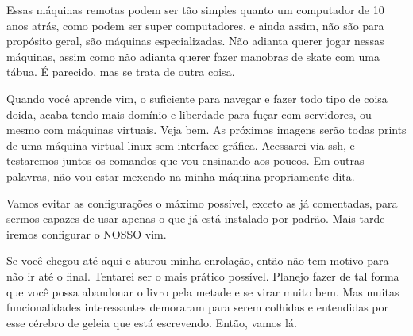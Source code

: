 Essas máquinas remotas podem ser tão simples quanto um computador de 10 anos atrás,
como podem ser super computadores, e ainda assim, não são para propósito geral, são máquinas especializadas.
Não adianta querer jogar nessas máquinas, assim como não adianta querer fazer manobras de skate com uma tábua.
É parecido, mas se trata de outra coisa.

Quando você aprende vim, o suficiente para navegar e fazer todo tipo de coisa doida,
acaba tendo mais domínio e liberdade para fuçar com servidores, ou mesmo com máquinas virtuais.
Veja bem. As próximas imagens serão todas prints de uma máquina virtual linux sem interface gráfica.
Acessarei via ssh, e testaremos juntos os comandos que vou ensinando aos poucos.
Em outras palavras, não vou estar mexendo na minha máquina propriamente dita.

Vamos evitar as configurações o máximo possível, exceto as já comentadas, para sermos capazes de usar
apenas o que já está instalado por padrão.
Mais tarde iremos configurar o NOSSO vim.

Se você chegou até aqui e aturou minha enrolação, então não tem motivo para não ir até o final.
Tentarei ser o mais prático possível.
Planejo fazer de tal forma que você possa abandonar o livro pela metade e se virar muito bem.
Mas muitas funcionalidades interessantes demoraram para serem colhidas e entendidas por esse cérebro
de geleia que está escrevendo. Então, vamos lá.

\newpage
